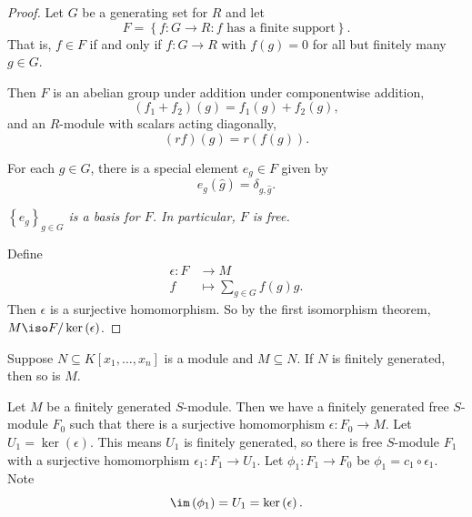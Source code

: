 \documentclass[co439]{subfiles}
\begin{document}
    \begin{proof}
        Let $G$ be a generating set for $R$ and let 
        \begin{equation*}
            F = \left\lbrace f:G\to R : f\text{ has a finite support} \right\rbrace.
        \end{equation*}
        That is, $f\in F$ if and only if $f:G\to R$ with $f\left( g \right) = 0$ for all but finitely many $g\in G$.

        Then $F$ is an abelian group under addition under componentwise addition,
        \begin{equation*}
            \left( f_1+f_2 \right)\left( g \right) = f_1\left( g \right)+f_2\left( g \right),
        \end{equation*}
        and an $R$-module with scalars acting diagonally,
        \begin{equation*}
            \left( rf \right)\left( g \right) = r\left( f\left( g \right) \right).
        \end{equation*}

        For each $g\in G$, there is a special element $e_g\in F$ given by
        \begin{equation*}
            e_g\left( \hat{g} \right) = \delta_{g,\hat{g}}.
        \end{equation*}

        \begin{claim}
            \textit{$\left\lbrace e_g \right\rbrace_{g\in G}$ is a basis for $F$. In particular, $F$ is free.}
        \end{claim}

        Define
        \begin{equation*}
            \begin{aligned}
                \epsilon:F&\to M \\
                f&\mapsto \sum^{}_{g\in G} f\left( g \right)g.
            \end{aligned} 
        \end{equation*}
        Then $\epsilon$ is a surjective homomorphism. So by the first isomorphism theorem, $M\iso F /\ker\left( \epsilon \right)$.
    \end{proof}
    
    \np Suppose $N\subseteq K\left[ x_1,\ldots,x_n \right]$ is a module and $M\subseteq N$. If $N$ is finitely generated, then so is $M$.

    \np Let $M$ be a finitely generated $S$-module. Then we have a finitely generated free $S$-module $F_0$ such that there is a surjective homomorphism $\epsilon:F_0\to M$. Let $U_1 = \ker\left( \epsilon \right)$. This means $U_1$ is finitely generated, so there is free $S$-module $F_1$ with a surjective homomorphism $\epsilon_1:F_1\to U_1$. Let $\phi_1:F_1\to F_0$ be $\phi_1=c_1\circ\epsilon_1$. Note
    \begin{equation*}
        \im\left( \phi_1 \right) = U_1 = \ker\left( \epsilon \right).
    \end{equation*}
\end{document}
